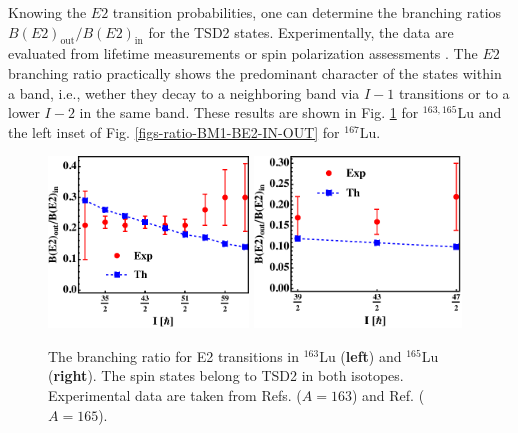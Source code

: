 Knowing the $E2$ transition probabilities, one can determine the branching ratios $B(E2)_\text{out}/B(E2)_\text{in}$ for the TSD2 states. Experimentally, the data are evaluated from lifetime measurements or spin polarization assessments \cite{timar2019experimental,sensharma2021wobbling,lvThesis}. The $E2$ branching ratio practically shows the predominant character of the states within a band, i.e., wether they decay to a neighboring band via $I-1$ transitions or to a lower $I-2$ in the same band. These results are shown in Fig. \ref{figs-BE2-IN-OUT} for $^{163,165}$Lu and the left inset of Fig. \ref{figs-ratio-BM1-BE2-IN-OUT} for $^{167}$Lu.
\begin{figure}
    \centering
    \includegraphics[width=0.475\textwidth]{Chapters/Figures/BE2inout-1.pdf}
    \includegraphics[width=0.49\textwidth]{Chapters/Figures/BE2inout-2.pdf}
    \caption{The branching ratio for E2 transitions in $^{163}$Lu (\textbf{left}) and $^{165}$Lu (\textbf{right}). The spin states belong to TSD2 in both isotopes. Experimental data are taken from Refs. \cite{hagemann2003wobbling,hamamoto2003nuclear,jensen2002evidence} ($A=163$) and Ref. \cite{schonwasser2003one} ($A=165$).}
    \label{figs-BE2-IN-OUT}
\end{figure}

